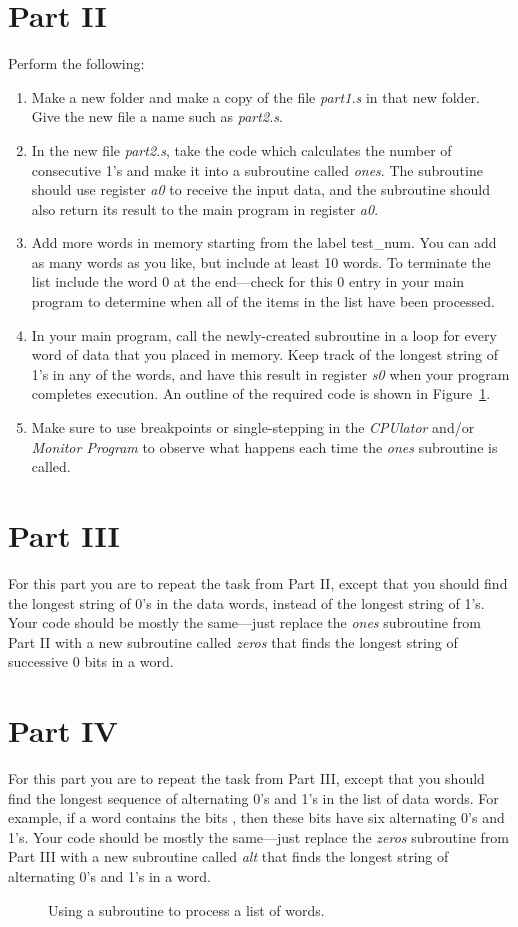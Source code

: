 \documentclass[epsfig,10pt,fullpage]{article}
\newcommand{\CommonDocsPath}{../../../../common/docs}
\begin{document}
\section*{Part II}
Perform the following:
\begin{enumerate}
\item Make a new folder and make a copy of the file {\it part1.s} in that new folder. Give
the new file a name such as {\it part2.s}.
\item In the new file {\it part2.s}, take the code which calculates the 
number of consecutive 1's and make it into a subroutine called {\it ones}. The subroutine 
should use register {\it a0} to receive the input data, and the subroutine should also 
return its result to the main program in register {\it a0}.
\item Add more words in memory starting from the label test\_num. You can add as many
words as you like, but include at least 10 words. To terminate the list include the word 0
at the end---check for this 0 entry in your main program to determine when all of the
items in the list have been processed.
\item In your main program, call the newly-created subroutine in a loop for every word of 
data that you placed in memory. Keep track of the longest string of 1's in any of the words, 
and have this result in register {\it s0} when your program completes execution. 
An outline of the required code is shown in Figure~\ref{fig:code2}.
\item Make sure to use breakpoints or single-stepping in the {\it CPUlator} and/or 
{\it Monitor Program} to observe what happens each time the {\it ones} subroutine is called.
\end{enumerate}

\section*{Part III}
For this part you are to repeat the task from Part II, except that you should find the 
longest string of 0's in the data words, instead of the longest string of 1's. Your code
should be mostly the same---just replace the {\it ones} subroutine from Part II with a 
new subroutine called {\it zeros} that finds the longest string of successive 0 bits in a
word.

\section*{Part IV}
For this part you are to repeat the task from Part III, except that you should find the 
longest sequence of alternating 0's and 1's in the list of data words. For example, if a
word contains the bits {}, then these bits have six alternating 0's and 1's.
Your code should be mostly the same---just replace the {\it zeros} subroutine from Part III 
with a new subroutine called {\it alt} that finds the longest string of alternating 0's
and 1's in a word.

\begin{figure}[H]
\begin{center}

\end{center}
\caption{Using a subroutine to process a list of words.}
\label{fig:code2}
\end{figure}


\end{document}

